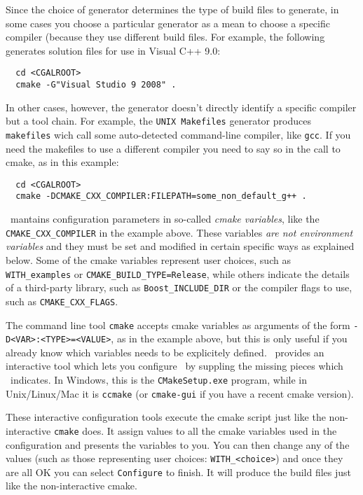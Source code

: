 Since the choice of generator determines the type of build files to generate, in some cases
you choose a particular generator as a mean to choose a specific compiler (because they use different 
build files. For example, the following generates solution files for use in Visual C++ 9.0:

{\ccTexHtml{\scriptsize}{}
\begin{verbatim}
  cd <CGALROOT> 
  cmake -G"Visual Studio 9 2008" . 
\end{verbatim}
}

In other cases, however, the generator doesn't directly identify a specific compiler but a tool chain.
For example, the \texttt{UNIX Makefiles} generator produces \texttt{makefiles} wich call some auto-detected
command-line compiler, like \texttt{gcc}. If you need the makefiles to use a different compiler you need to
say so in the call to cmake, as in this example:

{\ccTexHtml{\scriptsize}{}
\begin{verbatim}
  cd <CGALROOT> 
  cmake -DCMAKE_CXX_COMPILER:FILEPATH=some_non_default_g++ . 
\end{verbatim}
}


\cmake\ mantains configuration parameters in so-called {\em cmake variables}, like the \texttt{CMAKE\_CXX\_COMPILER}
in the example above. These variables {\em are not environment variables} and they must be set and modified in
certain specific ways as explained below. Some of the cmake variables represent user choices, such as
\texttt{WITH\_examples} or \texttt{CMAKE\_BUILD\_TYPE=Release}, while others indicate the details of a third-party library, 
such as \texttt{Boost\_INCLUDE\_DIR} or the compiler flags to use, such as \texttt{CMAKE\_CXX\_FLAGS}. 

The command line tool \texttt{cmake} accepts cmake variables as arguments of the form \texttt{-D<VAR>:<TYPE>=<VALUE>}, as
in the example above, but this is only useful if you already know which variables needs to be explicitely defined.
\cmake\ provides an interactive tool which lets you configure \cgal\ by suppling the missing pieces 
which \cmake\ indicates. In Windows, this is the \texttt{CMakeSetup.exe} program, while in Unix/Linux/Mac it is \texttt{ccmake}
(or \texttt{cmake-gui} if you have a recent cmake version). 

These interactive configuration tools execute the cmake script just like the non-interactive \texttt{cmake} does. It assign
values to all the cmake variables used in the configuration and presents the variables to you. You can then change 
any of the values (such as those representing user choices: \texttt{WITH\_<choice>}) and once they are all OK you can select 
\texttt{Configure} to finish. It will produce the build files just like the non-interactive cmake.

